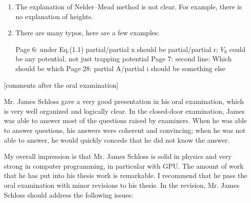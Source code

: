 \documentclass[11pt]{article}
\begin{document}
\begin{enumerate}
\item The explanation of Nelder--Mead method is not clear. For example, there is no explanation of heights.


\item There are many typos, here are a few examples:

Page 6: under Eq.(1.1) partial/partial x should be partial/partial r; $V_0$ could be any potential, not just trapping potential Page 7: second line: Which should be which Page 28: partial A/partial i should be something else


\end{enumerate}
[comments after the oral examination]

Mr. James Schloss gave a very good presentation in his oral examination, which is very well organized and logically clear. In the closed-door examination, James was able to answer most of the questions raised by examiners. When he was able to answer questions, his answers were coherent and convincing; when he was not able to answer, he would quickly concede that he did not know the answer.

My overall impression is that Mr. James Schloss is solid in physics and very strong in computer programming, in particular with GPU. The amount of work that he has put into his thesis work is remarkable. I recommend that he pass the oral examination with minor revisions to his thesis. In the revision, Mr. James Schloss should address the following issues:
\end{document}
